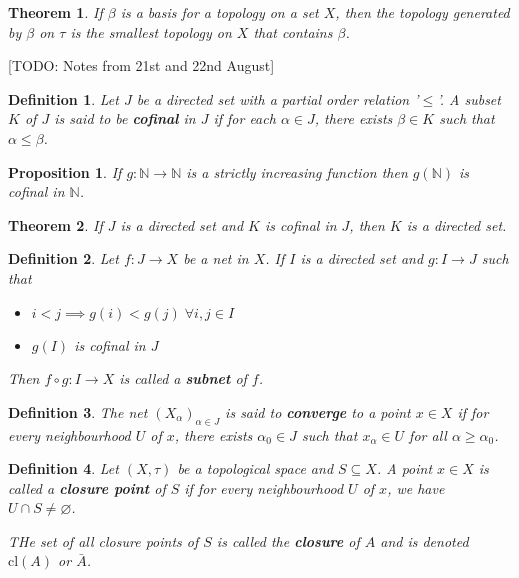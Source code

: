 \documentclass[12pt,twoside]{report}
\newtheorem{defn}{Definition}
\newtheorem{thm}{Theorem}
\newtheorem{prop}[subsection]{Proposition}
\begin{document}
\begin{thm}
    If $\beta$ is a basis for a topology on a set $X$, then the topology generated by $\beta$ on $\tau$ is the smallest topology on $X$ that contains $\beta$.
\end{thm}

[TODO: Notes from 21st and 22nd August]

\begin{defn}
    Let $J$ be a directed set with a partial order relation '$\leq$'. A subset $K$ of $J$ is said to be \textbf{cofinal} in $J$ if for each $\alpha \in J$, there exists $\beta \in K$ such that $\alpha \leq \beta$.
\end{defn}

\begin{prop}
    If $g \colon \mathbb{N} \to \mathbb{N}$ is a strictly increasing function then $g\left (\mathbb{N}\right )$ is cofinal in $\mathbb{N}$.
\end{prop}

\begin{thm}
    If $J$ is a directed set and $K$ is cofinal in $J$, then $K$ is a directed set.
\end{thm}

\begin{defn}
    Let $f \colon J \to X$ be a net in $X$. If $I$ is a directed set and $g \colon I \to J$ such that 
    \begin{itemize}
        \item $i < j \implies g\left (i\right ) < g\left (j\right ) \;\forall i, j \in I$
        \item $g\left (I\right )$ is cofinal in $J$
    \end{itemize}
    Then $f \circ g \colon I \to X$ is called a \textbf{subnet} of $f$.
\end{defn}

\begin{defn}
    The net $\left (X_\alpha\right )_{\alpha \in J}$ is said to \textbf{converge} to a point $x \in X$ if for every neighbourhood $U$ of $x$, there exists $\alpha_0 \in J$ such that $x_\alpha \in U$ for all $\alpha \geq \alpha_0$.
\end{defn}

\begin{defn}
    Let $\left (X, \tau\right )$ be a topological space and $S \subseteq X$. A point $x \in X$ is called a \textbf{closure point} of $S$ if for every neighbourhood $U$ of $x$, we have $U \cap S \neq  \varnothing$.

    THe set of all closure points of $S$ is called the \textbf{closure} of $A$ and is denoted $\text{cl}\left (A\right )$ or $\bar{A}$.
\end{defn}
\end{document}
